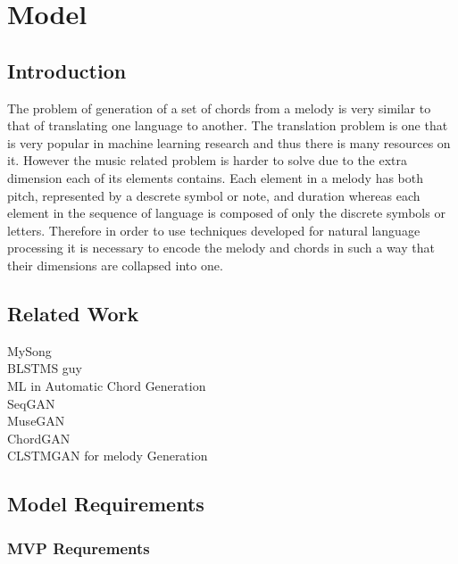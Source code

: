 
\chapter{Model} %

\label{Chapter4} %


\section{Introduction}


The problem of generation of a set of chords from a melody is very similar to that of translating one language to another. 
The translation problem is one that is very popular in machine learning research and thus there is many resources on it.  
However the music related problem is harder to solve due to the extra dimension each of its elements contains. 
Each element in a melody has both pitch, represented by a descrete symbol or note, and duration whereas each element in the sequence of language is composed of only the discrete symbols or letters.  
Therefore in order to use techniques developed for natural language processing it is necessary to encode the melody and chords in such a way that their dimensions are collapsed into one. 

\section{Related Work}

MySong \\
BLSTMS guy \\
ML in Automatic Chord Generation \\
SeqGAN \\  
MuseGAN \\      
ChordGAN \\       
CLSTMGAN for melody Generation \\

\section{Model Requirements}
\subsection{MVP Requrements}

